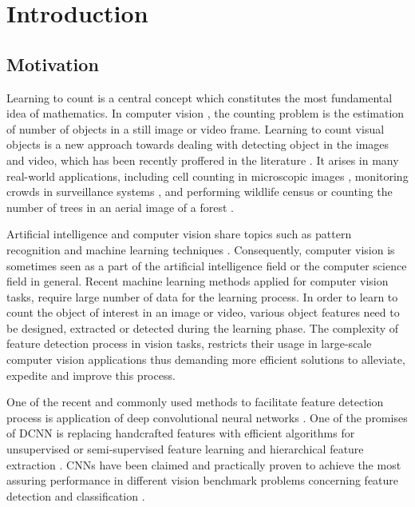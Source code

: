 \chapter{Introduction}
\label{sec:introduction}
\section{Motivation}

Learning to count is a central concept which constitutes the most fundamental idea of mathematics. In computer vision \cite{umbaugh1997computer}, the counting problem is the estimation of number of objects in a still image or video frame. Learning to count visual objects is a new approach towards dealing with detecting object in the images and video, which has been recently proffered in the literature \cite{viola2005detecting, rabaud2006counting, kong2005counting, chan2008privacy, segui2015learning}. It arises in many real-world applications, including cell counting in microscopic images \cite{flaccavento2011learning}, monitoring crowds in surveillance systems \cite{rahmalan2006crowd, valera2005intelligent}, and performing wildlife census or counting the number of trees in an aerial image of a forest \cite{brandtberg1998automated, pollock1996automatic,NIPS2010_4043}. 

Artificial intelligence and computer vision share topics such as pattern recognition and machine learning techniques \cite{michalski2013machine, mitchell1997machine}. Consequently, computer vision is sometimes seen as a part of the artificial intelligence field or the computer science field in general. Recent machine learning methods applied for computer vision tasks, require large number of data for the learning process. In order to learn to count the object of interest in an image or video, various object features need to be designed, extracted or detected during the learning phase. The complexity of feature detection process in vision tasks, restricts their usage in large-scale computer vision applications thus demanding more efficient solutions to alleviate, expedite and improve this process. 

\indent One of the recent and commonly used methods to facilitate feature detection process is application of deep convolutional neural networks \cite{szegedy2015going, krizhevsky2012imagenet, lecun1995convolutional, sermanet2013overfeat, ji20133d, taylor2010convolutional}. One of the promises of DCNN is replacing handcrafted features with efficient algorithms for unsupervised or semi-supervised feature learning and hierarchical feature extraction \cite{song2013hierarchical}. CNNs have been claimed and practically proven to achieve the most assuring performance in different vision benchmark problems concerning feature detection and classification \cite{ciresan2011flexible, szegedy2015going, ciresan2012multi}. 

